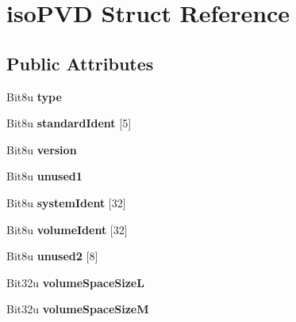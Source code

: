 \hypertarget{structisoPVD}{\section{iso\-P\-V\-D Struct Reference}
\label{structisoPVD}
}
\subsection*{Public Attributes}
\begin{DoxyCompactItemize}
\item 
\hypertarget{structisoPVD_a295254728ccd6fe21b046efe920476d9}{Bit8u {\bfseries type}}\label{structisoPVD_a295254728ccd6fe21b046efe920476d9}

\item 
\hypertarget{structisoPVD_ad1293f92da665904ccd074783ebf7fb0}{Bit8u {\bfseries standard\-Ident} \mbox{[}5\mbox{]}}\label{structisoPVD_ad1293f92da665904ccd074783ebf7fb0}

\item 
\hypertarget{structisoPVD_a8f037505259c3fa1ce32788356e279bd}{Bit8u {\bfseries version}}\label{structisoPVD_a8f037505259c3fa1ce32788356e279bd}

\item 
\hypertarget{structisoPVD_adb8cc5a7f7b245b82950463658102350}{Bit8u {\bfseries unused1}}\label{structisoPVD_adb8cc5a7f7b245b82950463658102350}

\item 
\hypertarget{structisoPVD_acc5bc0619ebcf069ff0220049583f640}{Bit8u {\bfseries system\-Ident} \mbox{[}32\mbox{]}}\label{structisoPVD_acc5bc0619ebcf069ff0220049583f640}

\item 
\hypertarget{structisoPVD_acc84160710b158bc4e566e0f293ca017}{Bit8u {\bfseries volume\-Ident} \mbox{[}32\mbox{]}}\label{structisoPVD_acc84160710b158bc4e566e0f293ca017}

\item 
\hypertarget{structisoPVD_aaf24c148674c337884fff2e66aa49316}{Bit8u {\bfseries unused2} \mbox{[}8\mbox{]}}\label{structisoPVD_aaf24c148674c337884fff2e66aa49316}

\item 
\hypertarget{structisoPVD_aacc06543c0a2d1bd33712f84e509cb24}{Bit32u {\bfseries volume\-Space\-Size\-L}}\label{structisoPVD_aacc06543c0a2d1bd33712f84e509cb24}

\item 
\hypertarget{structisoPVD_a053700914c4293a2ec00e0ded1a48dda}{Bit32u {\bfseries volume\-Space\-Size\-M}}\label{structisoPVD_a053700914c4293a2ec00e0ded1a48dda}


\end{DoxyCompactItemize}
